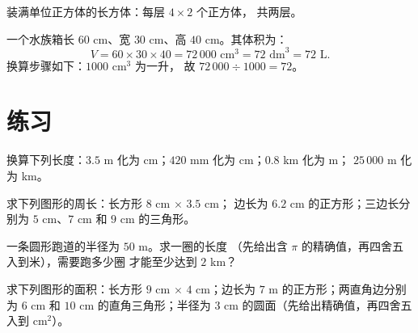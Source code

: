 \begin{omfigure}

{\small 装满单位正方体的长方体：每层 $4 \times 2$ 个正方体，
共两层。}
\end{omfigure}

\begin{example}\label{ex:g6:measure:aquarium}
一个水族箱长 $60$ cm、宽 $30$ cm、高 $40$ cm。其体积为：
\[
V = 60 \times 30 \times 40 = 72\,000 \text{ cm}^3 = 72 \text{ dm}^3
= 72 \text{ L}.
\]
换算步骤如下：$1000$ cm$^3$ 为一升，
故 $72\,000 \div 1000 = 72$。
\end{example}

\section{练习}

\begin{exercise}[$\star$]\label{exo:g6:measure:1}
换算下列长度：$3.5$ m 化为 cm；$420$ mm 化为 cm；$0.8$ km 化为 m；
$25\,000$ m 化为 km。
\end{exercise}

\begin{exercise}[$\star$]\label{exo:g6:measure:2}
求下列图形的周长：长方形 $8$ cm $\times$ $3.5$ cm；
边长为 $6.2$ cm 的正方形；三边长分别为 $5$ cm、$7$ cm
和 $9$ cm 的三角形。
\end{exercise}

\begin{exercise}[$\star$]\label{exo:g6:measure:3}
一条圆形跑道的半径为 $50$ m。求一圈的长度
（先给出含 $\pi$ 的精确值，再四舍五入到米），需要跑多少圈
才能至少达到 $2$ km？
\end{exercise}

\begin{exercise}[$\star$]\label{exo:g6:measure:4}
求下列图形的面积：长方形 $9$ cm $\times$ $4$ cm；边长为
$7$ m 的正方形；两直角边分别为 $6$ cm 和 $10$ cm 的直角三角形；半径为
$3$ cm 的圆面（先给出精确值，再四舍五入到 cm$^2$）。
\end{exercise}

